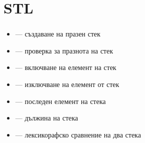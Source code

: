\documentclass{beamer}
\begin{document}
\section{STL}

\begin{frame}
  \frametitle{}

  \begin{itemize}
  \item {} --- създаване на празен стек
  \item {} --- проверка за празнота на стек
  \item {} --- включване на елемент на стек
  \item {} --- изключване на елемент от стек
  \item {} --- последен елемент на стека
  \item {} --- дължина на стека
  \item \lst{==,!=,<,>,<=,>=} --- лексикорафско сравнение на два стека
  \end{itemize}
\end{frame}
\end{document}
